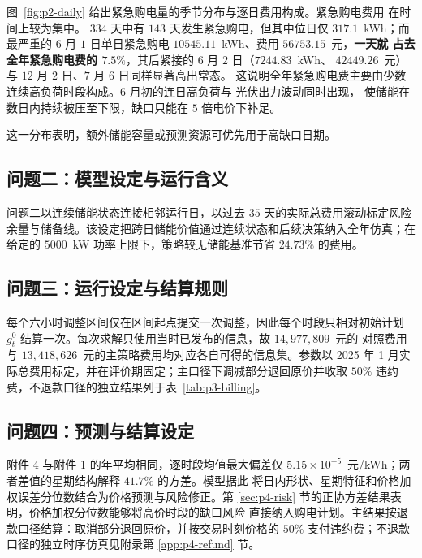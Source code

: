 图~\ref{fig:p2-daily} 给出紧急购电量的季节分布与逐日费用构成。紧急购电费用
在时间上较为集中。
$334$ 天中有 $143$ 天发生紧急购电，但其中位日仅 $317.1$~kWh；而最严重的
$6$ 月 $1$ 日单日紧急购电 $10545.11$~kWh、费用 $56753.15$~元，\textbf{一天就
占去全年紧急购电费的 $7.5\%$}，其后紧接的 $6$ 月 $2$ 日（$7244.83$~kWh、
$42449.26$~元）与 $12$ 月 $2$ 日、$7$ 月 $6$ 日同样显著高出常态。
这说明全年紧急购电费主要由少数连续高负荷时段构成。$6$ 月初的连日高负荷与
光伏出力波动同时出现，
使储能在数日内持续被压至下限，缺口只能在 $5$ 倍电价下补足。

这一分布表明，额外储能容量或预测资源可优先用于高缺口日期。

\subsection{问题二：模型设定与运行含义}

问题二以连续储能状态连接相邻运行日，以过去 $35$ 天的实际总费用滚动标定风险
余量与储备线。该设定把跨日储能价值通过连续状态和后续决策纳入全年仿真；在给定的
$5000$~kW 功率上限下，策略较无储能基准节省 $24.73\%$ 的费用。

\subsection{问题三：运行设定与结算规则}

每个六小时调整区间仅在区间起点提交一次调整，因此每个时段只相对初始计划
$g_t^0$ 结算一次。每次求解只使用当时已发布的信息，故 $14{,}977{,}809$~元的
对照费用与 $13{,}418{,}626$~元的主策略费用均对应各自可得的信息集。参数以
2025 年 1 月实际总费用标定，并在评价期固定；主口径下调减部分退回原价并收取
$50\%$ 违约费，不退款口径的独立结果列于表~\ref{tab:p3-billing}。

\subsection{问题四：预测与结算设定}
\label{app:p4-limit}

附件 4 与附件 1 的年平均相同，逐时段均值最大偏差仅
$5.15\times10^{-5}$~元/kWh；两者差值的星期结构解释 $41.7\%$ 的方差。模型据此
将日内形状、星期特征和价格加权误差分位数结合为价格预测与风险修正。第
\ref{sec:p4-risk} 节的正协方差结果表明，价格加权分位数能够将高价时段的缺口风险
直接纳入购电计划。主结果按退款口径结算：取消部分退回原价，并按交易时刻价格的
$50\%$ 支付违约费；不退款口径的独立时序仿真见附录第 \ref{app:p4-refund} 节。
